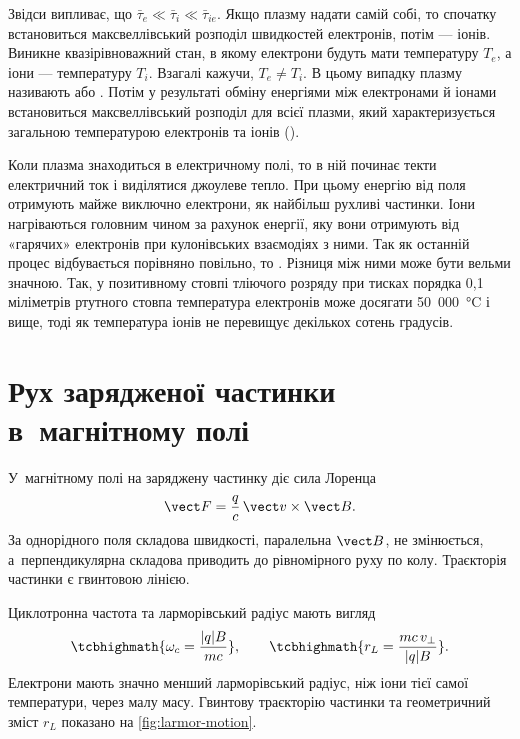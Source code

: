 Звідси випливає, що $\bar{\tau}_e \ll \bar{\tau}_i \ll \bar{\tau}_{ie}$. Якщо плазму надати самій собі, то спочатку встановиться максвеллівський розподіл швидкостей електронів, потім --- іонів. Виникне квазірівноважний стан, в якому електрони будуть мати температуру $T_e$, а іони --- температуру $T_i$. Взагалі кажучи, $T_e \neq T_i$. В цьому випадку плазму називають  або . Потім у результаті обміну енергіями між електронами й іонами встановиться максвеллівський розподіл для всієї плазми, який характеризується загальною температурою електронів та іонів ().

Коли плазма знаходиться в електричному полі, то в ній починає текти електричний ток і виділятися джоулеве тепло. При цьому енергію від поля отримують майже виключно електрони, як найбільш рухливі частинки. Іони нагріваються головним чином за рахунок енергії, яку вони отримують від «гарячих» електронів при кулонівських взаємодіях з ними. Так як останній процес відбувається порівняно повільно, то . Різниця між ними може бути вельми значною. Так, у позитивному стовпі тліючого розряду при тисках порядка 0,1 міліметрів ртутного стовпа температура електронів може досягати 50~000~°C і вище, тоді як температура іонів не перевищує декількох сотень градусів.

\section{Рух зарядженої частинки в~магнітному полі}\label{sec:magnetic-field-motion}

У~магнітному полі на заряджену частинку діє сила Лоренца
\begin{equation}
	\vect F=\frac{q}{c}\,\vect v\times\vect B.
\end{equation}
За однорідного поля складова швидкості, паралельна $\vect B$, не змінюється, а~перпендикулярна складова приводить до рівномірного руху по колу. Траєкторія частинки є гвинтовою лінією.

Циклотронна частота та ларморівський радіус мають вигляд
\begin{equation}
	\tcbhighmath{\omega_c=\frac{|q|B}{mc}},
	\qquad
	\tcbhighmath{r_L=\frac{mc\,v_\perp}{|q|B}}.
\end{equation}
Електрони мають значно менший ларморівський радіус, ніж іони тієї самої температури, через малу масу. Гвинтову траєкторію частинки та геометричний зміст $r_L$ показано на \ref{fig:larmor-motion}.

